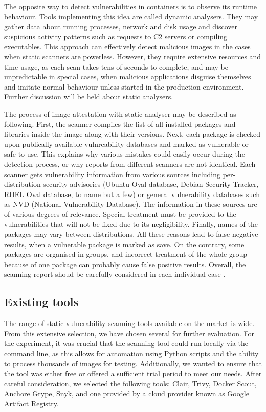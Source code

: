 The opposite way to detect vulnerabilities in containers is to observe its runtime behaviour. Tools implementing this idea are called dynamic analysers. They may gather data about running processes, network and disk usage and discover suspicious activity patterns such as requests to C2 servers or compiling executables. This approach can effectively detect malicious images in the cases when static scanners are powerless. However, they require extensive resources and time usage, as each scan takes tens of seconds to complete, and may be unpredictable in special cases, when malicious applications disguise themselves and imitate normal behaviour unless started in the production environment. Further discussion will be held about static analysers.

The process of image attestation with static analyser may be described as following. First, the scanner compiles the list of all installed packages and libraries inside the image along with their versions. Next, each package is checked upon publically available vulnreability databases and marked as vulnerable or safe to use. This explains why various mistakes could easily occur during the detection process, or why reports from different scanners are not identical. Each scanner gets vulnerability information from various sources including per-distribution security advisories (Ubuntu Oval database, Debian Security Tracker, RHEL Oval database, to name but a few) or general vulnerability databases such as NVD (National Vulnerability Database). The information in these sources are of various degrees of relevance. Special treatment must be provided to the vulnerabilities that will not be fixed due to its negligibility. Finally, names of the packages may vary between distributions. All these reasons lead to false negative results, when a vulnerable package is marked as save. On the contrary, some packages are organised in groups, and incorrect treatment of the whole group because of one package can probably cause false positive results. Overall, the scanning report shoud be carefully considered in each individual case \cite{book:rice}.

\subsection{Existing tools}

The range of static vulnerability scanning tools available on the market is wide. From this extensive selection, we have chosen several for further evaluation. For the experiment, it was crucial that the scanning tool could run locally via the command line, as this allows for automation using Python scripts and the ability to process thousands of images for testing. Additionally, we wanted to ensure that the tool was either free or offered a sufficient trial period to meet our needs. After careful consideration, we selected the following tools: Clair, Trivy, Docker Scout, Anchore Grype, Snyk, and one provided by a cloud provider known as Google Artifact Registry.

